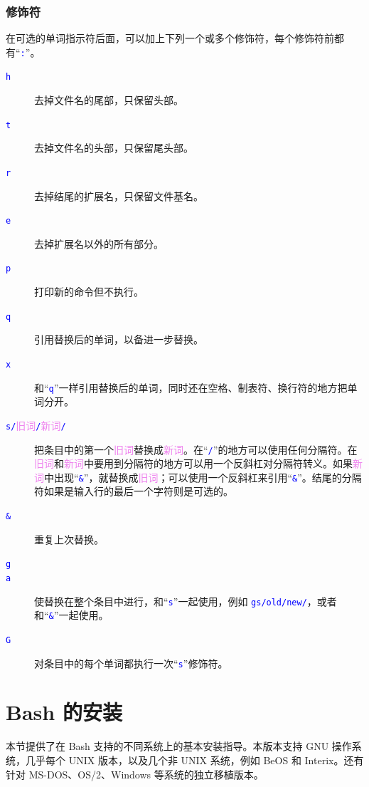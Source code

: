 \documentclass[openany,notitlepage]{book}
\newcommand{\code}[1]{\textcolor{blue}{{\tt #1}}}
\newcommand{\hs}[1]{{\textcolor{violet}{#1}}}
\begin{document}
\begin{CJK}{UTF8}{song}
\subsection{修饰符} %
在可选的单词指示符后面，可以加上下列一个或多个修饰符，每个修饰符前都有``\code{:}''。
\begin{description}
    \item[\code{h}] 去掉文件名的尾部，只保留头部。
    \item[\code{t}] 去掉文件名的头部，只保留尾头部。
    \item[\code{r}] 去掉结尾的扩展名，只保留文件基名。
    \item[\code{e}] 去掉扩展名以外的所有部分。
    \item[\code{p}] 打印新的命令但不执行。
    \item[\code{q}] 引用替换后的单词，以备进一步替换。
    \item[\code{x}] 和``\code{q}''一样引用替换后的单词，同时还在空格、制表符、换行符的地方把单词分开。
    \item[\code{s/}\hs{旧词}\code{/}\hs{新词}\code{/}] 把条目中的第一个\hs{旧词}替换成\hs{新词}。在``\code{/}''的地方可以使用任何分隔符。在\hs{旧词}和\hs{新词}中要用到分隔符的地方可以用一个反斜杠对分隔符转义。如果\hs{新词}中出现``\code{\&}''，就替换成\hs{旧词}；可以使用一个反斜杠来引用``\code{\&}''。结尾的分隔符如果是输入行的最后一个字符则是可选的。
    \item[\code{\&}] 重复上次替换。
    \item[\code{g}]
    \item[\code{a}] 使替换在整个条目中进行，和``\code{s}''一起使用，例如 \code{gs/old/new/}，或者和``\code{\&}''一起使用。
    \item[\code{G}] 对条目中的每个单词都执行一次``\code{s}''修饰符。
\end{description}



\chapter{Bash 的安装} %
本节提供了在 Bash 支持的不同系统上的基本安装指导。本版本支持 GNU 操作系统，几乎每个 UNIX 版本，以及几个非 UNIX 系统，例如 BeOS 和 Interix。还有针对 MS-DOS、OS/2、Windows 等系统的独立移植版本。


\end{CJK}
\end{document}
